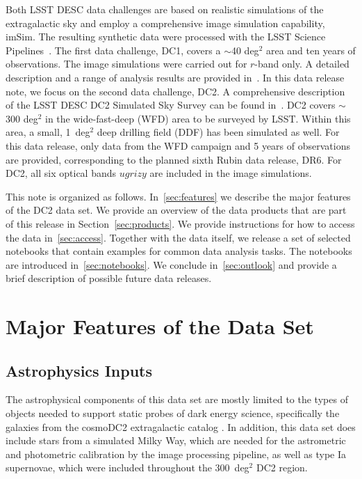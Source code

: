 \documentclass[11pt]{report}
\begin{document}
Both LSST DESC data challenges are based on realistic simulations of the extragalactic sky and employ a comprehensive image simulation capability, imSim. The resulting synthetic data were processed with the LSST Science Pipelines~\citep{2017ASPC..512..279J}. The first data challenge, DC1, covers a $\sim$40 deg$^2$ area and ten years of observations. The image simulations were carried out for $r$-band only. A detailed description and a range of analysis results are provided in~\cite{dc1}.  In this data release note, we focus on the second data challenge, DC2. A comprehensive description of the LSST DESC DC2 Simulated Sky Survey can be found in~\cite{2020arXiv201005926L}. DC2 covers $\sim$300 deg$^2$ in the wide-fast-deep (WFD) area to be surveyed by LSST. Within this area, a small, 1~deg$^2$ deep drilling field (DDF) has been simulated as well. For this data release, only data from the WFD campaign and 5 years of observations are provided, corresponding to the planned sixth Rubin data release, DR6. For DC2, all six optical bands $ugrizy$ are included in the image simulations.  



This note is organized as follows. In~\autoref{sec:features} we describe the major features of the DC2 data set. We provide an overview of the data products that are part of this release in Section~\autoref{sec:products}. We provide instructions for how to access the data in~\autoref{sec:access}. Together with the data itself, we release a set of selected notebooks that contain examples for common data analysis tasks. The notebooks are introduced in~\autoref{sec:notebooks}.
We conclude in~\autoref{sec:outlook} and provide a brief description of possible future data releases. 

\section{Major Features of the Data Set}
\label{sec:features}

\subsection{Astrophysics Inputs}

The astrophysical components of this data set are mostly limited to the types of objects needed to support static probes of dark energy science, specifically the galaxies from the cosmoDC2 extragalactic catalog \citep{korytov}.  In addition, this data set does include stars from a simulated Milky Way, which are needed for the astrometric and photometric calibration by the image processing pipeline, as well as type Ia supernovae, which were included throughout the 300~deg$^2$ DC2 region.
\end{document}
